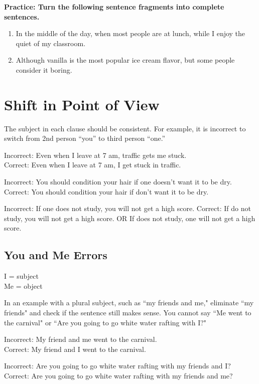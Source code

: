 \bigskip
\textbf{Practice: Turn the following sentence fragments into complete sentences.}
\begin{enumerate}
\item{In the middle of the day, when most people are at lunch, while I enjoy the quiet of my classroom.} \hrulefill 
\item{Although vanilla is the most popular ice cream flavor, but some people consider it boring.} \hrulefill
\end{enumerate} 

\section{Shift in Point of View}
The subject in each clause should be consistent.  For example, it is incorrect to switch from 2nd person “you” to third person “one.”

\bigskip
Incorrect: Even when I leave at 7 am, traffic gets me stuck.\\
Correct:  Even when I leave at 7 am, I get stuck in traffic.

\bigskip
Incorrect:  You should condition your hair if one doesn't want it to be dry.
Correct:  You should condition your hair if \longline don't want it to be dry.

\bigskip
Incorrect: If one does not study, you will not get a high score.
Correct:  If \longline  do not study, you will not get a high score.  OR  If \longline  does not study, one will not get a high score.

\subsection{You and Me Errors}
I = subject\\
Me = object

\bigskip
In an example with a plural subject, such as ``my friends and me," eliminate ``my friends" and check if the sentence still makes sense.  You cannot say ``Me went to the carnival" or ``Are you going to go white water rafting with I?"

\bigskip
Incorrect:  My friend and me went to the carnival.\\
Correct:  My friend and I went to the carnival.

\bigskip
Incorrect:  Are you going to go white water rafting with my friends and I? \\
Correct:  Are you going to go white water rafting with my friends and me?

